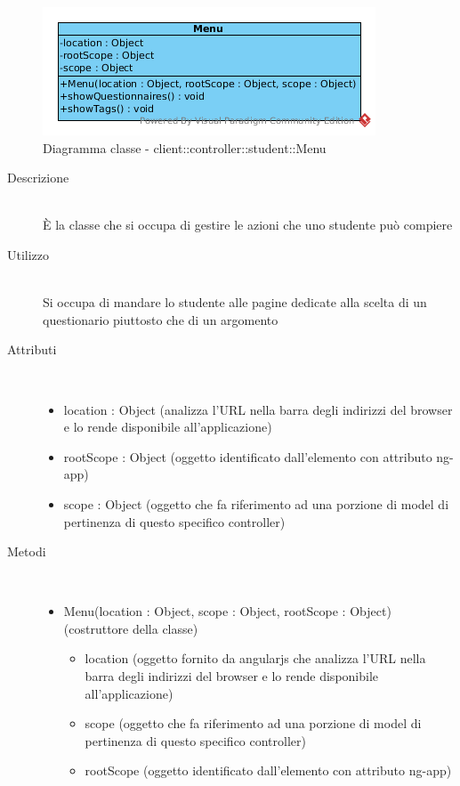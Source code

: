 \begin{center}
			\begin{figure}[H]
				\centering \includegraphics[scale=4, max width=\textwidth, max height=\myheight]{../img/diagrammiClassi/client/controller/student/Menu.png}
				\caption{Diagramma classe - client::controller::student::Menu}
			\end{figure}
		\end{center}\begin{description}
\item[Descrizione] \hfill \\
 È la classe che si occupa di gestire le azioni che uno studente può compiere
\item[Utilizzo] \hfill \\
 Si occupa di mandare lo studente alle pagine dedicate alla scelta di un questionario piuttosto che di un argomento 
\item[Attributi] \hfill \\
 \vspace{-7mm}
\begin{itemize}
\item location : Object (analizza l'URL nella barra degli indirizzi del browser e lo rende disponibile all'applicazione)
\item rootScope : Object (oggetto identificato dall’elemento con attributo ng-app)
\item scope : Object (oggetto che fa riferimento ad una porzione di model di pertinenza di questo specifico controller)
\end{itemize}

\item[Metodi] \hfill \\
 \vspace{-7mm}
\begin{itemize}
\item Menu(location : Object, scope : Object, rootScope : Object) (costruttore della classe)\begin{itemize}
\item location (oggetto fornito da angularjs che analizza l'URL nella barra degli indirizzi del browser e lo rende disponibile all'applicazione)
\item scope (oggetto che fa riferimento ad una porzione di model di pertinenza di questo specifico controller)
\item rootScope (oggetto identificato dall’elemento con attributo ng-app)
\end{itemize}


\end{itemize}
\end{description}
